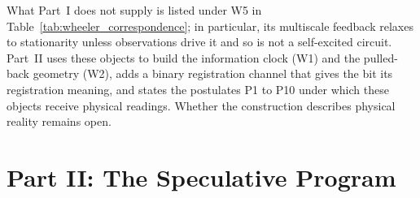 What Part~I does not supply is listed under W5 in Table~\ref{tab:wheeler_correspondence}; in particular, its multiscale feedback relaxes to stationarity unless observations drive it and so is not a self-excited circuit. Part~II uses these objects to build the information clock (W1) and the pulled-back geometry (W2), adds a binary registration channel that gives the bit its registration meaning, and states the postulates P1 to P10 under which these objects receive physical readings. Whether the construction describes physical reality remains open.

\part*{Part II: The Speculative Program}
